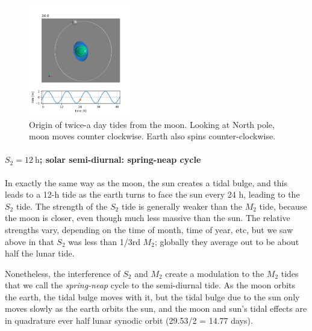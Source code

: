 \begin{figure}[hbtp]
\begin{center}
    \includegraphics[width=1.75in]{figs/Waves/AboveEq/frame0240}
    \caption{Origin of twice-a day tides from the moon. Looking at North pole, moon moves counter clockwise.  Earth also spins counter-clockwise. }
    \label{fig:AboveEq}
  \end{center}
\end{figure}

\paragraph{$S_2 = 12\ \mathrm{h}$; solar semi-diurnal: spring-neap cycle}
In exactly the same way as the moon, the sun creates a tidal bulge, and this leads to a 12-h tide as the earth turns to face the sun every 24 h, leading to the $S_2$ tide.  The strength of the $S_2$ tide is generally weaker than the $M_2$ tide, because the moon is closer, even though much less massive than the sun.  The relative strengths vary, depending on the time of month, time of year, etc, but we saw above in  that $S_2$ was less than 1/3rd $M_2$; globally they average out to be about half the lunar tide.  

Nonetheless, the interference of $S_2$ and $M_2$ create a modulation to the $M_2$ tides that we call the \emph{spring-neap} cycle to the semi-diurnal tide.  As the moon orbits the earth, the tidal bulge moves with it, but the tidal bulge due to the sun only moves slowly as the earth orbits the sun, and the moon and sun's tidal effects are in quadrature ever half lunar synodic orbit (29.53/2 = 14.77 days).  
 
